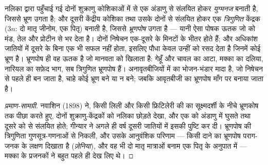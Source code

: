 \begin{proposition}[द्विनिषेचन]\label{prop:b2:angiosperm-reproduction:double}
नलिका द्वारा पहुँचाई गई दोनों शुक्राणु कोशिकाओं में से एक
अंडाणु से संलयित होकर  \emph{युग्मनज} बनाती है, जिससे भ्रूण
उगता है; और दूसरी केंद्रीय कोशिका तथा उसके दोनों  से
संलयित होकर एक \emph{त्रिगुणित} केंद्रक ($3n$: दो मातृ जीनोम, एक
पितृ) बनाती है, जिससे \emph{भ्रूणपोष} उगता है --- यानी ऐसा पोषक ऊतक जो
 को मंड, तेल और प्रोटीन से भर देता है। दोनों
निषेचन एक-दूसरे के मिनटों के भीतर होते हैं; और अधिकांश जातियों में
दूसरे के बिना एक भी सफल नहीं होता, इसलिए पौधा केवल उन्हीं  को रसद
देता है जिनमें कोई भ्रूण है। भ्रूणपोष ही वह ऊतक है जो मानवता को खिलाता
है: गेहूँ और चावल का आटा, मक्का का दलिया, नारियल का सफ़ेद भाग,
सब त्रिगुणित भ्रूणपोष हैं। अनावृतबीजियों में  का भोजन-भंडार मादा
 है, जो निषेचन से पहले ही बन जाता है, चाहे कोई भ्रूण बने या
न बने; जबकि आवृतबीजी का भ्रूणपोष माँग पर बनाया जाता है।
\end{proposition}
\begin{proof}[प्रमाण-सामग्री]
नवाशिन (1898) ने, किसी लिली और किसी फ्रिटिलेरी की  का
सूक्ष्मदर्शी के नीचे भ्रूणकोष तक पीछा करते हुए, दोनों शुक्राणु-केंद्रकों
को नलिका छोड़ते देखा, और एक को अंडाणु में घुसते तथा दूसरे को
 से संलयित होते; गीन्यार ने अगले ही वर्ष दूसरी
जातियों में इसकी पुष्टि कर दी। भ्रूणपोष की त्रिगुणिता गुणसूत्र-गणनाओं
से निकली, और उसके आनुवंशिक परिणाम --- किसी दाने का भ्रूणपोष
पराग-जनक के लक्षण दिखाता है (\emph{ज़ेनिया}), और वह भी दो मातृ
मात्राओं बनाम एक पितृ के अनुपात में --- मक्का के प्रजनकों ने बहुत पहले
ही देख लिए थे।
\end{proof}

